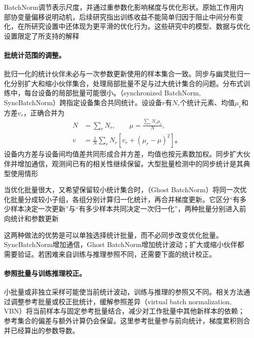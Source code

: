 BatchNorm调节表示尺度，并通过重参数化影响梯度与优化形状。原始工作用内部协变量偏移说明动机，后续研究指出训练收益不能简单归因于阻止中间分布变化，在所研究设置中还体现为更平滑的优化行为。这些研究中的模型、数据与优化设置限定了所支持的解释

\paragraph{批统计范围的调整。}

批归一化的统计伙伴未必与一次参数更新使用的样本集合一致。同步与幽灵批归一化分别扩大和缩小伙伴集合，处理局部批量不足与过大统计集合的问题。分布式训练中，每台设备的局部批量可能很小。（synchronized BatchNorm, SyncBatchNorm）跨指定设备集合共同统计。设设备$r$有$N_r$个统计元素、均值$\mu_r$和方差$v_r$，正确合并为
\begin{equation}
  \begin{aligned}
    N&=\sum_rN_r,\qquad \mu=\frac{\sum_rN_r\mu_r}{N},\\
    v&=\frac1N\sum_rN_r[v_r+(\mu_r-\mu)^2]\text{。}
  \end{aligned}
  \label{eq:training-sync-batchnorm}
\end{equation}
设备内方差与设备间均值差共同形成合并方差，均值也按元素数加权。同步扩大伙伴并增加通信，观测间已有的相关性继续保留。大型批量检测中的同步统计是其典型使用情形

当优化批量很大，又希望保留较小统计集合时，（Ghost BatchNorm）将同一次优化批量分成较小子组，各组分别计算归一化统计，再合并梯度更新。它区分“有多少样本决定一次更新”与“有多少样本共同决定一次归一化”，两种批量分别进入前向统计和参数更新

这两种做法的优势是可以单独选择统计批量，而不必同步改变优化批量。SyncBatchNorm增加通信，Ghost BatchNorm增加统计波动；扩大或缩小伙伴都需要验证。若困难来自训练与推理参照不同，还需要下面的统计校正。

\paragraph{参照批量与训练推理校正。}

小批量或非独立采样可能使当前统计波动，训练与推理的参照又不同。相关方法通过调整参考批量或校正批统计，缓解参照差异（virtual batch normalization, VBN）将当前样本与固定参考批量结合，减少对工作批量中其他新样本的依赖；参考集合的偏差与额外计算仍会保留。这里参考批量参与前向统计，梯度累积则合并已经算出的参数导数。

